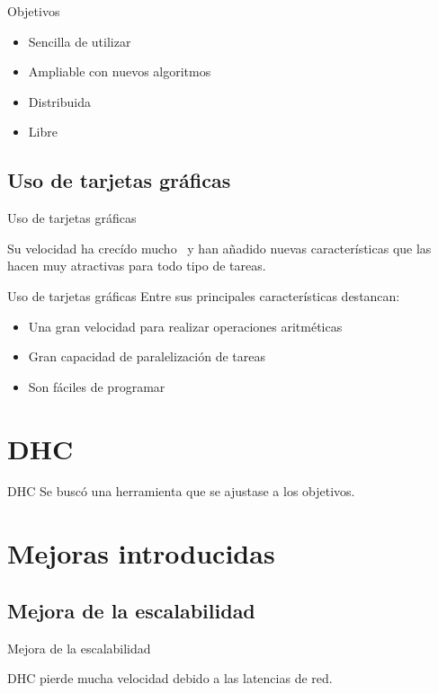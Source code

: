 \documentclass[12pt,hyperref={pdfpagelabels=false}]{beamer}
\begin{document}
\begin{frame}{Objetivos}
	\begin{itemize}
		\item Sencilla de utilizar
		\item Ampliable con nuevos algoritmos
		\item Distribuida
		\item Libre
	\end{itemize}
\end{frame}

\subsection{Uso de tarjetas gráficas}
\begin{frame}{Uso de tarjetas gráficas}
	\begin{center}
		Su velocidad ha crecído mucho~\cite{nvidia:cuda_c_programming_guide} y han añadido nuevas características que las hacen muy atractivas para todo tipo de tareas.
	\end{center}
\end{frame}

\begin{frame}{Uso de tarjetas gráficas}
	Entre sus principales características destancan:
	\pause
	\begin{itemize}
		\item Una gran velocidad para realizar operaciones aritméticas
		\item Gran capacidad de paralelización de tareas
		\item Son fáciles de programar
	\end{itemize}
\end{frame}


\section{DHC}
\begin{frame}{DHC}
	Se buscó una herramienta que se ajustase a los objetivos.
\end{frame}

\section{Mejoras introducidas}

\subsection{Mejora de la escalabilidad}
\begin{frame}{Mejora de la escalabilidad}
	\begin{center}
		DHC pierde mucha velocidad debido a las latencias de red.
	\end{center}
\end{frame}
\end{document}
